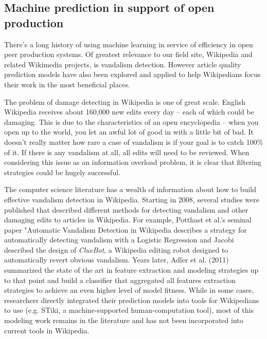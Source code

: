 \subsection{Machine prediction in support of open production}
There's a long history of using machine learning in service of efficiency in open peer production systems.  Of greatest relevance to our field site, Wikipedia and related Wikimedia projects, is vandalism detection.  However article quality prediction models have also been explored and applied to help Wikipedians focus their work in the most beneficial places.

 The problem of damage detecting in Wikipedia is one of great scale.  English Wikipedia receives about 160,000 new edits every day -- each of which could be damaging.  This is due to the characteristics of an open encyclopedia -- when you open up to the world, you let an awful lot of good in with a little bit of bad.  It doesn't really matter how rare a case of vandalism is if your goal is to catch 100\% of it.  If there is any vandalism at all, all edits will need to be reviewed.  When considering this issue as an information overload problem, it is clear that filtering strategies could be hugely successful.

The computer science literature has a wealth of information about how to build effective vandalism detection in Wikipedia.  Starting in 2008, several studies were published that described different methods for detecting vandalism and other damaging edits to articles in Wikipedia.  For example, Potthast et al.'s seminal paper "Automatic Vandalism Detection in Wikipedia\cite{potthast2008automatic} describes a strategy for automatically detecting vandalism with a Logistic Regression and Jacobi described the design of \emph{ClueBot}\cite{carter2008cluebot}, a Wikipedia editing robot designed to automatically revert obvious vandalism.  Years later, Adler et al. (2011) summarized the state of the art in feature extraction and modeling strategies up to that point and build a classifier that aggregated all features extraction strategies to achieve an even higher level of model fitness\cite{adler2011wikipedia}.  While in some cases, researchers directly integrated their prediction models into tools for Wikipedians to use (e.g. STiki\cite{west2010stiki}, a machine-supported human-computation tool), most of this modeling work remains in the literature and has not been incorporated into current tools in Wikipedia.

